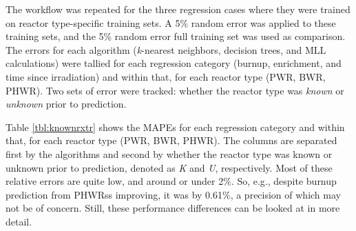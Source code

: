 The workflow was repeated for the three regression cases where they were
trained on reactor type-specific training sets. A 5\% random error was applied
to these training sets, and the 5\% random error full training set was used as
comparison. The errors for each algorithm (\textit{k}-nearest neighbors,
decision trees, and \gls{MLL} calculations) were tallied for each regression
category (burnup, enrichment, and time since irradiation) and within that, for
each reactor type (\gls{PWR}, \gls{BWR}, \gls{PHWR}). Two sets of error were
tracked: whether the reactor type was \textit{known} or \textit{unknown} prior
to prediction.

Table \ref{tbl:knownrxtr} shows the \gls{MAPE}s for each regression category
and within that, for each reactor type (\gls{PWR}, \gls{BWR}, \gls{PHWR}).  The
columns are separated first by the algorithms and second by whether the reactor
type was known or unknown prior to prediction, denoted as \textit{K} and
\textit{U}, respectively. Most of these relative errors are quite low, and
around or under 2\%.  So, e.g., despite burnup prediction from \glspl{PHWR}s
improving, it was by 0.61\%, a precision of which may not be of concern. Still,
these performance differences can be looked at in more detail.  

